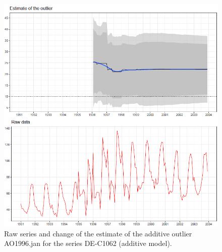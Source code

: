 \documentclass[12pt, a4paper]{article}
\begin{document}
\begin{figure}[!hb]
\begin{center}
 \includegraphics[width=16cm]{img/DE-C1062-EstimateAO.PNG}
 \caption[Raw series and change of the estimate of the additive outlier AO1996.jan for the series DE-C1062 (additive model)]{Raw series and change of the estimate of the additive outlier AO1996.jan for the series DE-C1062 (additive model).}
 \label{fig:DE-C1062}
\end{center}
\end{figure}
\end{document}
